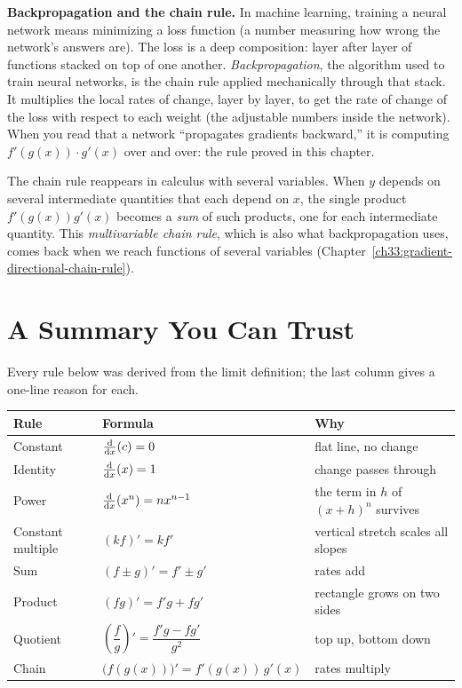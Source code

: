 \begin{applicationbox}
\textbf{Backpropagation and the chain rule.} In machine learning, training a neural
network means minimizing a loss function (a number measuring how wrong the network's
answers are). The loss is a deep composition: layer after layer of functions stacked
on top of one another. \emph{Backpropagation}, the algorithm used to train neural
networks, is the chain rule applied mechanically through that stack. It multiplies
the local rates of change, layer by layer, to get the rate of change of the loss with
respect to each weight (the adjustable numbers inside the network). When you read that
a network ``propagates gradients backward,'' it is computing $f'(g(x))\cdot g'(x)$ over
and over: the rule proved in this chapter.
\end{applicationbox}

\begin{connectionbox}
The chain rule reappears in calculus with several variables. When $y$ depends on
several intermediate quantities that each depend on $x$, the single product
$f'(g(x))g'(x)$ becomes a \emph{sum} of such products, one for each intermediate
quantity. This \emph{multivariable chain rule}, which is also what backpropagation
uses, comes back when we reach functions of several variables
(Chapter~\ref{ch33:gradient-directional-chain-rule}).
\end{connectionbox}

\section{A Summary You Can Trust}
\label{ch11:summary}

Every rule below was derived from the limit definition; the last column gives a
one-line reason for each.

\begin{center}
\renewcommand{\arraystretch}{1.5}
\begin{tabular}{@{}lll@{}}
\toprule
\textbf{Rule} & \textbf{Formula} & \textbf{Why} \\
\midrule
Constant & $\frac{\mathrm{d}}{\mathrm{d} x}\!\left(c\right) = 0$ & flat line, no change \\
Identity & $\frac{\mathrm{d}}{\mathrm{d} x}\!\left(x\right) = 1$ & change passes through \\
Power & $\frac{\mathrm{d}}{\mathrm{d} x}\!\left(x^n\right) = n x^{n-1}$ & the term in $h$ of $(x+h)^n$ survives \\
Constant multiple & $(kf)' = k f'$ & vertical stretch scales all slopes \\
Sum & $(f\pm g)' = f' \pm g'$ & rates add \\
Product & $(fg)' = f'g + fg'$ & rectangle grows on two sides \\
Quotient & $\left(\dfrac{f}{g}\right)' = \dfrac{f'g - fg'}{g^2}$ & top up, bottom down \\
Chain & $\big(f(g(x))\big)' = f'(g(x))\,g'(x)$ & rates multiply \\
\bottomrule
\end{tabular}
\end{center}


